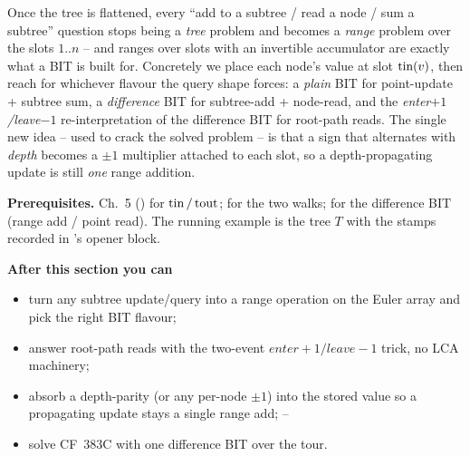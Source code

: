 \begin{topicintro}
Once the tree is flattened, every ``add to a subtree / read a node / sum a
subtree'' question stops being a \emph{tree} problem and becomes a \emph{range}
problem over the slots \(1..n\) -- and ranges over slots with an invertible
accumulator are exactly what a BIT is built for.  Concretely we place each
node's value at slot \(\operatorname{tin}(v)\), then reach for whichever 
flavour the query shape forces: a \emph{plain} BIT for point-update + subtree
sum, a \emph{difference} BIT for subtree-add + node-read, and the
\emph{enter\(+1\)/leave\(-1\)} re-interpretation of the difference BIT for
root-path reads.  The single new idea -- used to crack the solved problem -- is
that a sign that alternates with \emph{depth} becomes a \(\pm1\) multiplier
attached to each slot, so a depth-propagating update is still \emph{one} range
addition.

\textbf{Prerequisites.} Ch.~5 () for \(\operatorname{tin}/\operatorname{tout}\);
 for the two walks;  for the difference BIT
(range add / point read).  The running example is the tree \(T\) with the
stamps recorded in 's opener block.

\textbf{After this section you can}
\begin{itemize}[nosep]
  \item turn any subtree update/query into a range operation on the Euler
        array and pick the right BIT flavour; \hfill{}
  \item answer root-path reads with the two-event \(\mathit{enter}{+}1 /
        \mathit{leave}{-}1\) trick, no LCA machinery; \hfill{}
  \item absorb a depth-parity (or any per-node \(\pm1\)) into the stored
        value so a propagating update stays a single range add; \hfill{}--
  \item solve CF~383C with one difference BIT over the tour. \hfill{}
\end{itemize}
\end{topicintro}

